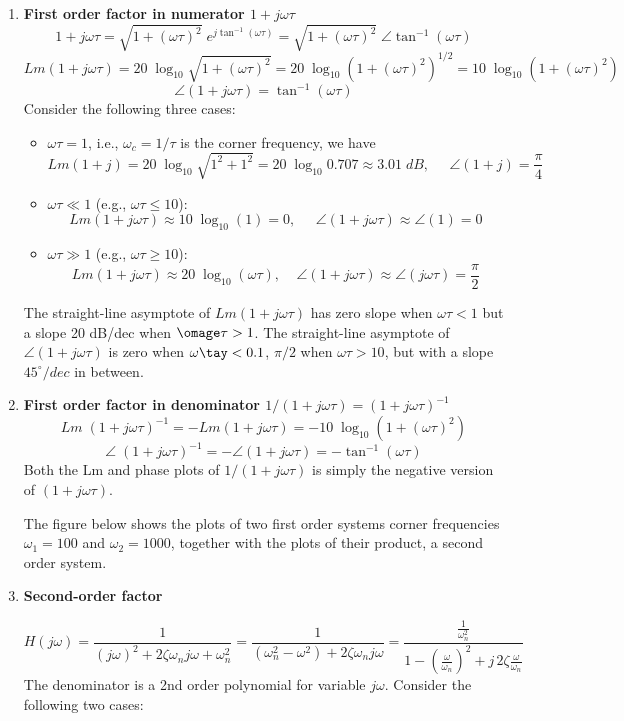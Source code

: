 \begin{enumerate}
\item {\bf First order factor in numerator $1+j\omega\tau$}
  \[ 1+j\omega \tau=\sqrt{1+(\omega \tau)^2}\;e^{j\tan^{-1}(\omega \tau)}
  =\sqrt{1+(\omega \tau)^2}\;\angle \tan^{-1}(\omega \tau) \]
  \[ Lm(1+j\omega \tau)=20\;\log_{10}\sqrt{1+(\omega \tau)^2}
  =20\;\log_{10}(1+(\omega \tau)^2)^{1/2}=10\;\log_{10}(1+(\omega \tau)^2) \]
  \[ \angle(1+j\omega \tau)=\tan^{-1}(\omega\tau) \]
  Consider the following three cases:
  \begin{itemize}
  \item $\omega\tau=1$, i.e., $\omega_c=1/\tau$ is the corner frequency, we have
    \[ Lm(1+j)=20\;\log_{10} \sqrt{1^2+1^2}=20\;\log_{10} 0.707\approx 3.01\;dB,\;\;\;\;\;
    \angle(1+j)=\frac{\pi}{4} \]
  \item $\omega\tau \ll 1$ (e.g., $\omega\tau\le 10$):
    \[ Lm(1+j\omega \tau)\approx10\;\log_{10}(1)=0,\;\;\;\;\;
    \angle(1+j\omega \tau)\approx \angle(1)=0 \]
  \item $\omega\tau \gg 1$ (e.g., $\omega\tau\ge 10$):
    \[ Lm(1+j\omega \tau)\approx 20\;\log_{10}(\omega \tau),\;\;\;\;
    \angle(1+j\omega \tau)\approx \angle(j\omega \tau)=\frac{\pi}{2} \]
  \end{itemize}
  The straight-line asymptote of $Lm(1+j\omega\tau)$ has zero slope when $\omega\tau<1$
  but a slope 20 dB/dec when $\omage\tau>1$. The straight-line asymptote of 
  $\angle(1+j\omega\tau)$ is zero when $\omega\tay<0.1$, $\pi/2$ when $\omega\tau>10$, 
  but with a slope $45^\circ/dec$ in between.

\item {\bf First order factor in denominator $1/(1+j\omega\tau)=(1+j\omega\tau)^{-1}$}
  \[ Lm\;(1+j\omega\tau)^{-1}=-Lm(1+j\omega\tau)
  =-10\;\log_{10}(1+(\omega \tau)^2) \]
  \[ \angle\;(1+j\omega \tau)^{-1}=-\angle(1+j\omega \tau)
  =-\tan^{-1}(\omega\tau) \]
  Both the Lm and phase plots of $1/(1+j\omega\tau)$ is simply the negative 
  version of $(1+j\omega\tau)$. 

  The figure below shows the plots of two first order systems corner frequencies 
  $\omega_1=100$ and $\omega_2=1000$, together with the plots of their product, a 
  second order system.


\item {\bf Second-order factor}

  \[ H(j\omega)=\frac{1}{(j\omega)^2+2\zeta\omega_n j\omega+\omega_n^2}
  =\frac{1}{(\omega^2_n-\omega^2)+2\zeta\omega_n j\omega}
  =\frac{\frac{1}{\omega_n^2}}{1-(\frac{\omega}{\omega_n})^2+j\,2\zeta\frac{\omega}{\omega_n}} \]
  The denominator is a 2nd order polynomial for variable $j\omega$. Consider the
  following two cases:


\end{enumerate}
